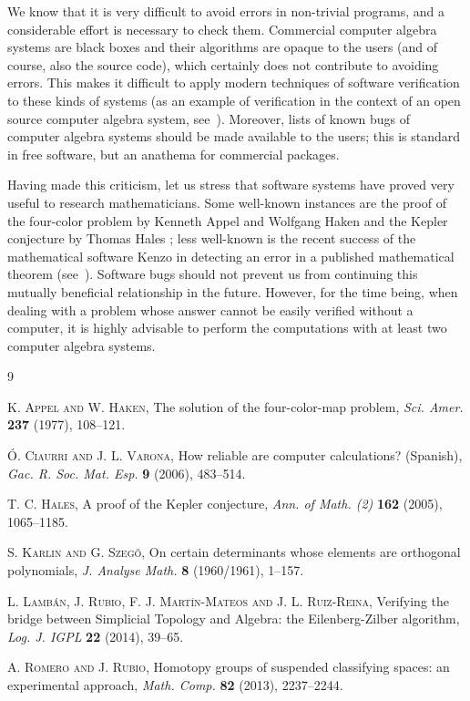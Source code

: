 \documentclass[12pt]{article}
\begin{document}
We know that it is very difficult to avoid errors in non-trivial programs, and a considerable effort is necessary to check them. Commercial computer algebra systems are black boxes and their algorithms are opaque to the users (and of course, also the source code), which certainly does not contribute to avoiding errors. This makes it difficult to apply modern techniques of software verification to these kinds of systems (as an example of verification in the context of an open source computer algebra system, see~\cite{LMRR}). Moreover, lists of known bugs of computer algebra systems should be made available to the users; this is standard in free software, but an anathema for commercial packages.

Having made this criticism, let us stress that software systems have proved very useful to research mathematicians. Some well-known instances are the proof of the four-color problem by Kenneth Appel and Wolfgang Haken \cite{AH} and the Kepler conjecture by Thomas Hales \cite{H}; less well-known is the recent success of the mathematical software Kenzo in detecting an error in a published mathematical theorem (see~\cite{RR}). Software bugs should not prevent us from continuing this mutually beneficial relationship in the future.
However, for the time being, when dealing with a problem whose answer cannot be easily verified without a computer, it is highly advisable to perform the computations with at least two computer algebra systems.

\begin{thebibliography}{9}

\frenchspacing

\textsc{K. Appel and W. Haken},
The solution of the four-color-map problem,
\emph{Sci. Amer.} \textbf{237} (1977), 108--121.

\textsc{\'O. Ciaurri and J. L. Varona},
How reliable are computer calculations? (Spanish), %
\emph{Gac. R. Soc. Mat. Esp.} \textbf{9} (2006), 483--514.

\textsc{T. C. Hales},
A proof of the Kepler conjecture,
\emph{Ann. of Math. (2)} \textbf{162} (2005), 1065--1185.

\textsc{S. Karlin and G. Szeg\H{o}},
On certain determinants whose elements are orthogonal polynomials,
\emph{J. Analyse Math.} \textbf{8} (1960/1961), 1--157.

\textsc{L. Lamb\'an, J. Rubio, F. J. Mart\'in-Mateos and J. L. Ruiz-Reina},
Verifying the bridge between Simplicial Topology and Algebra: the Eilenberg-Zilber algorithm,
\emph{Log. J. IGPL} \textbf{22} (2014), 39--65. %

\textsc{A. Romero and J. Rubio},
Homotopy groups of suspended classifying spaces: an experimental approach, 
\emph{Math. Comp.}  \textbf{82} (2013), 2237--2244.

\end{thebibliography}
\end{document}
